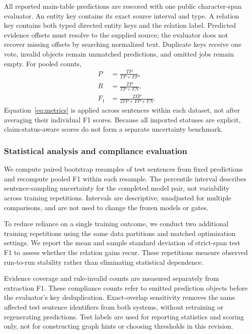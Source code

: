 \documentclass[a4paper,fleqn,numbers,doubleblind]{cas-dc}
\begin{document}
All reported main-table predictions are rescored with one public
character-span evaluator. An entity key contains its exact source interval
and type. A relation key contains both typed directed entity keys and the
relation label. Predicted evidence offsets must resolve to the supplied source;
the evaluator does not recover missing offsets by searching normalized text.
Duplicate keys receive one vote, invalid objects remain unmatched predictions,
and omitted jobs remain empty. For pooled counts,
\begin{equation}
\begin{aligned}
P&=\frac{TP}{TP+FP},\\
R&=\frac{TP}{TP+FN},\\
F_1&=\frac{2TP}{2TP+FP+FN}.
\end{aligned}
\label{eq:metrics}
\end{equation}
Equation~\eqref{eq:metrics} is applied across sentences within each dataset,
not after averaging their individual F1 scores. Because all imported statuses
are explicit, claim-status-aware scores do not form a separate uncertainty
benchmark.

\subsubsection{Statistical analysis and compliance evaluation}
We compute paired bootstrap resamples of test sentences from fixed predictions
and recompute pooled F1 within each resample.
The percentile interval describes sentence-sampling uncertainty for the
completed model pair, not variability across training repetitions. Intervals are
descriptive, unadjusted for multiple comparisons, and are not used to change
the frozen models or gates.

To reduce reliance on a single training outcome, we conduct two additional
training repetitions using the same data partitions and matched optimization
settings. We report the mean and sample standard deviation of strict-span
test F1 to assess whether the relation gains recur. These repetitions measure
observed run-to-run stability rather than eliminating statistical dependence.

Evidence coverage and rule-invalid counts are measured separately from
extraction F1. These compliance counts refer to emitted prediction objects
before the evaluator's key deduplication. Exact-overlap sensitivity removes
the same affected test sentence identifiers from both systems, without
retraining or regenerating predictions. Test labels are used for reporting
statistics and scoring only, not for constructing graph hints or choosing
thresholds in this revision.
\end{document}
